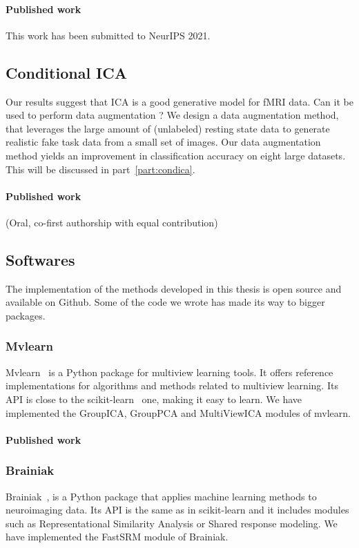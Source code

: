\documentclass[ twoside,openright,titlepage,numbers=noenddot,%
                headinclude,footinclude,cleardoublepage=empty,abstract=on,
                BCOR=5mm,paper=a4,fontsize=11pt, 
                ]{scrreprt}
\begin{document}
\paragraph{Published work} This work has been submitted to NeurIPS 2021.

\subsection{Conditional ICA}
Our results suggest that ICA is a good generative model for fMRI data. Can it be
used to perform data augmentation ? We design a data augmentation method, that
leverages the large amount of (unlabeled) resting state data to generate
realistic fake task data from a small set of images.
Our data augmentation method yields an improvement in classification accuracy on
eight large datasets. This will be discussed in part~\ref{part:condica}.

\paragraph{Published work}
 (Oral, co-first authorship with equal contribution)

\subsection{Softwares}
The implementation of the methods developed in this thesis is open source and
available on Github. Some of the code we wrote has made its way to bigger
packages. 

\subsubsection{Mvlearn}
Mvlearn~\cite{perry2020mvlearn} is a Python package for multiview learning tools. It offers reference
implementations for algorithms and methods related to multiview learning.
Its API is close to the scikit-learn~\cite{abraham2014machine} one, making it
easy to learn.
We have implemented the GroupICA, GroupPCA and MultiViewICA modules of mvlearn.

\paragraph{Published work}



\subsubsection{Brainiak}
Brainiak~\cite{kumar2020brainiak}, is a Python package that applies machine
learning methods to neuroimaging data. Its API is the same as in scikit-learn
and it includes modules such as Representational Similarity Analysis or Shared
response modeling.
We have implemented the FastSRM module of Brainiak.
\end{document}
